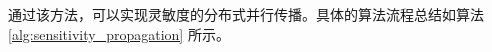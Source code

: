 \documentclass[lang=chs, degree=master, blindreview=true, winfonts=true]{yanputhesis}
\begin{document}
通过该方法，可以实现灵敏度的分布式并行传播。具体的算法流程总结如算法 \ref{alg:sensitivity_propagation} 所示。




\end{document}
